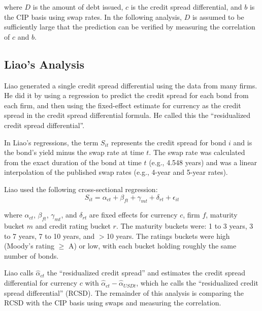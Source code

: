 \noindent where $D$ is the amount of debt issued, $c$ is the credit spread differential, and $b$ is the CIP basis using swap rates.  In the following analysis, $D$ is assumed to be sufficiently large that the prediction can be verified by measuring the correlation of $c$ and $b$.


\subsection{Liao's Analysis} \label{rcsd_section}

Liao generated a single credit spread differential using the data from many firms.  He did it by using a regression to predict the credit spread for each bond from each firm, and then using the fixed-effect estimate for currency as the credit spread in the credit spread differential formula.  He called this the ``residualized credit spread differential''. 

In Liao's regressions, the term $S_{it}$ represents the credit spread for bond $i$ and is the bond's yield minus the swap rate at time $t$.  The swap rate was calculated from the exact duration of the bond at time $t$ (e.g., 4.548 years) and was a linear interpolation of the published swap rates (e.g., 4-year and 5-year rates).\cite{Liao_email2}

Liao used the following cross-sectional regression:
\begin{equation}
  \label{liao_regression}
S_{it} = \alpha_{ct} + \beta_{ft} + \gamma_{mt} + \delta_{rt} + \epsilon_{it}
\end{equation}

\noindent where $\alpha_{ct}$, $\beta_{ft}$, $\gamma_{mt}$, and $\delta_{rt}$ are fixed effects for currency $c$, firm $f$, maturity bucket $m$ and credit rating bucket $r$.   The maturity buckets were: 1 to 3 years, 3 to 7 years, 7 to 10 years, and $>$10 years.  The ratings buckets were high (Moody's rating $\ge$ A) or low, with each bucket holding roughly the same number of bonds.

Liao calls $\hat{\alpha}_{ct}$ the ``residualized credit spread'' and estimates the credit spread differential for currency $c$ with $\hat{\alpha}_{ct} - \hat{\alpha}_{USDt}$, which he calls the ``residualized credit spread differential'' (RCSD).   The remainder of this analysis is comparing the RCSD with the CIP basis using swaps and measuring the correlation.\cite{Liao_email1}  

